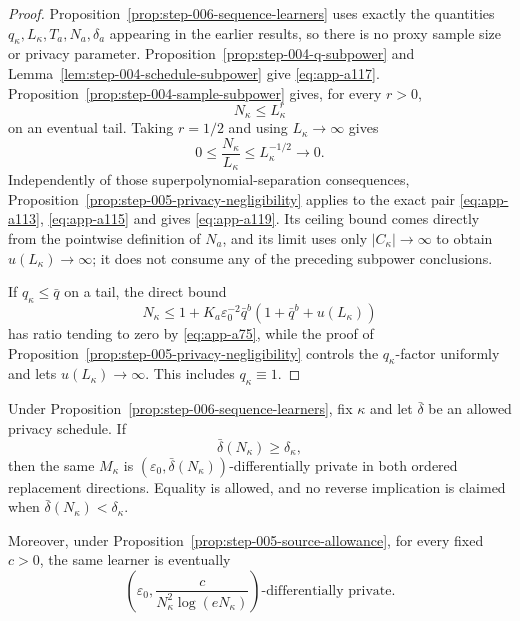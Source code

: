\begin{proof}
Proposition~\ref{prop:step-006-sequence-learners} uses exactly the
quantities \(q_\kappa,L_\kappa,T_a,N_a,\delta_a\) appearing in the
earlier results, so there is no proxy sample size or privacy
parameter.  Proposition~\ref{prop:step-004-q-subpower} and
Lemma~\ref{lem:step-004-schedule-subpower} give \eqref{eq:app-a117}.
Proposition~\ref{prop:step-004-sample-subpower} gives, for every
\(r>0\),
\begin{equation}
N_\kappa\leq L_\kappa^r
\label{eq:app-a120}
\end{equation}
on an eventual tail.  Taking \(r=1/2\) and using
\(L_\kappa\to\infty\) gives
\begin{equation}
0\leq\frac{N_\kappa}{L_\kappa}
\leq L_\kappa^{-1/2}
\longrightarrow0.
\label{eq:app-a121}
\end{equation}
Independently of those superpolynomial-separation consequences,
Proposition~\ref{prop:step-005-privacy-negligibility} applies to the
exact pair \eqref{eq:app-a113}, \eqref{eq:app-a115} and gives \eqref{eq:app-a119}.
Its ceiling bound comes directly from the pointwise definition of
\(N_a\), and its limit uses only \(|C_\kappa|\to\infty\) to obtain
\(u(L_\kappa)\to\infty\); it does not consume any of the preceding
subpower conclusions.

If \(q_\kappa\leq\bar q\) on a tail, the direct bound
\[
N_\kappa
\leq
1+K_a\varepsilon_0^{-2}\bar q^b
(1+\bar q^b+u(L_\kappa))
\]
has ratio tending to zero by \eqref{eq:app-a75}, while the proof of
Proposition~\ref{prop:step-005-privacy-negligibility} controls the
\(q_\kappa\)-factor uniformly and lets \(u(L_\kappa)\to\infty\).
This includes \(q_\kappa\equiv1\).
\end{proof}

\begin{lemma}
\label{lem:step-006-privacy-relaxation}
Under Proposition~\ref{prop:step-006-sequence-learners}, fix
\(\kappa\) and let \(\bar\delta\) be an allowed privacy schedule.  If
\begin{equation}
\bar\delta(N_\kappa)\geq\delta_\kappa,
\label{eq:app-a122}
\end{equation}
then the same \(M_\kappa\) is
\((\varepsilon_0,\bar\delta(N_\kappa))\)-differentially private in
both ordered replacement directions.  Equality is allowed, and no
reverse implication is claimed when
\(\bar\delta(N_\kappa)<\delta_\kappa\).

Moreover, under
Proposition~\ref{prop:step-005-source-allowance}, for every fixed
\(c>0\), the same learner is eventually
\begin{equation}
\left(
\varepsilon_0,
\frac{c}{N_\kappa^2\log(eN_\kappa)}
\right)\text{-differentially private}.
\label{eq:app-a123}
\end{equation}
\end{lemma}

